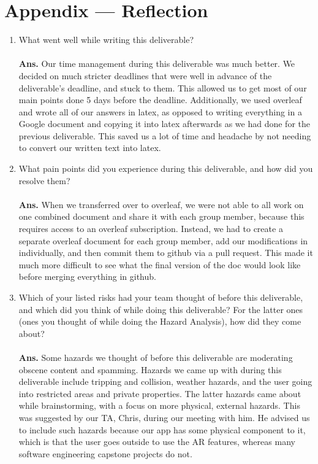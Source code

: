 \documentclass{article}
\begin{document}
\section*{Appendix --- Reflection}



\begin{enumerate}
    \item What went well while writing this deliverable? \\ \\
    \hspace*{-0.97cm}\textbf{Ans.} Our time management during this deliverable was much better. We decided on much stricter deadlines that were well in advance of the deliverable's deadline, and stuck to them. This allowed us to get most of our main points done 5 days before the deadline. Additionally, we used overleaf and wrote all of our answers in latex, as opposed to writing everything in a Google document and copying it into latex afterwards as we had done for the previous deliverable. This saved us a lot of time and headache by not needing to convert our written text into latex.  \\

    \item What pain points did you experience during this deliverable, and how did you resolve them? \\ \\
    \hspace*{-0.97cm}\textbf{Ans.} When we transferred over to overleaf, we were not able to all work on one combined document and share it with each group member, because this requires access to an overleaf subscription. Instead, we had to create a separate overleaf document for each group member, add our modifications in individually, and then commit them to github via a pull request. This made it much more difficult to see what the final version of the doc would look like before merging everything in github. \\

    \item Which of your listed risks had your team thought of before this
    deliverable, and which did you think of while doing this deliverable? For
    the latter ones (ones you thought of while doing the Hazard Analysis), how did they come about? \\ \\
    \hspace*{-0.97cm}\textbf{Ans.} Some hazards we thought of before this deliverable are moderating obscene content and spamming. Hazards we came up with during this deliverable include tripping and collision, weather hazards, and the user going into restricted areas and private properties. The latter hazards came about while brainstorming, with a focus on more physical, external hazards. This was suggested by our TA, Chris, during our meeting with him. He advised us to include such hazards because our app has some physical component to it, which is that the user goes outside to use the AR features, whereas many software engineering capstone projects do not. \\


\end{enumerate}
\end{document}
